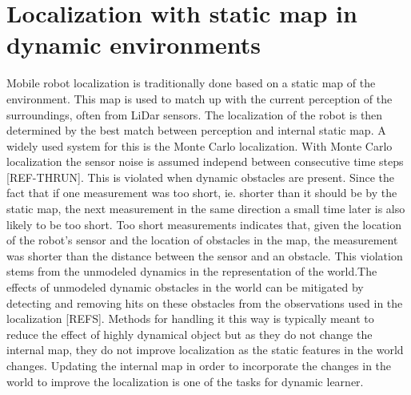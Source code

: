 \section{Localization with static map in dynamic environments}
Mobile robot localization is traditionally done based on a static map of the environment. This map is used to match up with the current perception of the surroundings, often from LiDar sensors. The localization of the robot is then determined by the best match between perception and internal static map. A widely used system for this is the Monte Carlo localization. With Monte Carlo localization the sensor noise is assumed independ between consecutive time steps [REF-THRUN]. This is violated when dynamic obstacles are present. Since the fact that if one measurement was too short, ie. shorter than it should be by the static map, the next measurement in the same direction a small time later is also likely to be too short. Too short measurements indicates that, given the location of the robot’s sensor and the location of obstacles in the map, the measurement was shorter than the distance between the sensor and an obstacle. This violation stems from the unmodeled dynamics in the representation of the world.The effects of unmodeled dynamic obstacles in the world can be mitigated by detecting and removing hits on these obstacles from the observations used in the localization [REFS]. Methods for handling it this way is typically meant to reduce the effect of highly dynamical object but as they do not change the internal map, they do not improve localization as the static features in the world changes. Updating the internal map in order to incorporate the changes in the world to improve the localization is one of the tasks for dynamic learner. 
